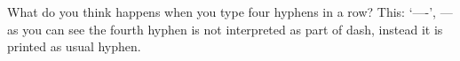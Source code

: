 What do you think happens when you type four hyphens in a row?
This: `----', --- as you can see the fourth hyphen is not interpreted
as part of dash, instead it is printed as usual hyphen.
\bye

